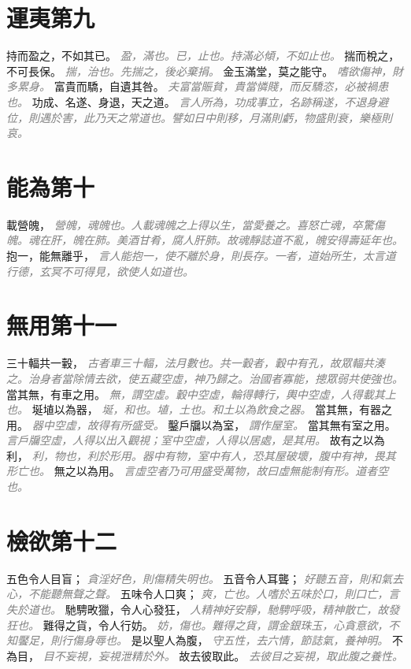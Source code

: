 \documentclass[a4paper,zihao=-4,oneside,landscape,UTF8]{ctexart}
\newcommand{\zhushi}[1]{\scriptsize{\textit{\textcolor{gray}{#1}}}\normalsize}
\begin{document}
\section{運夷第九}

持而盈之，不如其已。
\zhushi{盈，滿也。已，止也。持滿必傾，不如止也。}
揣而梲之，不可長保。
\zhushi{揣，治也。先揣之，後必棄捐。}
金玉滿堂，莫之能守。
\zhushi{嗜欲傷神，財多累身。}
富貴而驕，自遺其咎。
\zhushi{夫富當賑貧，貴當憐賤，而反驕恣，必被禍患也。}
功成、名遂、身退，天之道。
\zhushi{言人所為，功成事立，名跡稱遂，不退身避位，則遇於害，此乃天之常道也。譬如日中則移，月滿則虧，物盛則衰，樂極則哀。}


\section{能為第十}

載營魄，
\zhushi{營魄，魂魄也。人載魂魄之上得以生，當愛養之。喜怒亡魂，卒驚傷魄。魂在肝，魄在肺。美酒甘肴，腐人肝肺。故魂靜誌道不亂，魄安得壽延年也。}
抱一，能無離乎，
\zhushi{言人能抱一，使不離於身，則長存。一者，道始所生，太言道行德，玄冥不可得見，欲使人如道也。}


\section{無用第十一}

三十輻共一轂，
\zhushi{古者車三十輻，法月數也。共一轂者，轂中有孔，故眾輻共湊之。治身者當除情去欲，使五藏空虛，神乃歸之。治國者寡能，摠眾弱共使強也。}
當其無，有車之用。
\zhushi{無，謂空虛。轂中空虛，輪得轉行，輿中空虛，人得載其上也。}
埏埴以為器，
\zhushi{埏，和也。埴，土也。和土以為飲食之器。}
當其無，有器之用。
\zhushi{器中空虛，故得有所盛受。}
鑿戶牖以為室，
\zhushi{謂作屋室。}
當其無有室之用。
\zhushi{言戶牖空虛，人得以出入觀視；室中空虛，人得以居處，是其用。}
故有之以為利，
\zhushi{利，物也，利於形用。器中有物，室中有人，恐其屋破壞，腹中有神，畏其形亡也。}
無之以為用。
\zhushi{言虛空者乃可用盛受萬物，故曰虛無能制有形。道者空也。}


\section{檢欲第十二}

五色令人目盲；
\zhushi{貪淫好色，則傷精失明也。}
五音令人耳聾；
\zhushi{好聽五音，則和氣去心，不能聽無聲之聲。}
五味令人口爽；
\zhushi{爽，亡也。人嗜於五味於口，則口亡，言失於道也。}
馳騁畋獵，令人心發狂，
\zhushi{人精神好安靜，馳騁呼吸，精神散亡，故發狂也。}
難得之貨，令人行妨。
\zhushi{妨，傷也。難得之貨，謂金銀珠玉，心貪意欲，不知饜足，則行傷身辱也。}
是以聖人為腹，
\zhushi{守五性，去六情，節誌氣，養神明。}
不為目，
\zhushi{目不妄視，妄視泄精於外。}
故去彼取此。
\zhushi{去彼目之妄視，取此腹之養性。}
\end{document}
